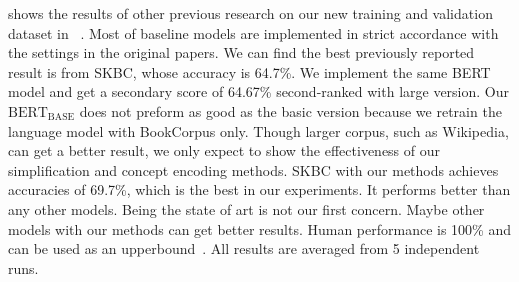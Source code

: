  shows the results of other previous research on our new training 
and validation dataset in ~. Most of baseline models are implemented in strict accordance with the settings in the original papers.  
We can find the best previously reported result is from SKBC, whose accuracy is 64.7\%.
We implement the same BERT model and get a secondary score of 64.67\%
second-ranked with large version. 
Our $\text{BERT}_\text{BASE}$ does not preform as good as the basic version because we retrain the 
language model with BookCorpus only.  Though larger corpus, such as  Wikipedia, can get a better result,
we only expect to show the effectiveness of our simplification and concept encoding methods. 
SKBC with our methods achieves accuracies of 69.7\%, which is the best in our experiments. 
It performs better than any other models. Being the state of art is not our first concern. 
Maybe other models with our methods can get better 
results.
Human performance is 100\% and can be used as an 
upperbound~\cite{mostafazadeh2016corpus}. 
All results are averaged from
5 independent runs. 


